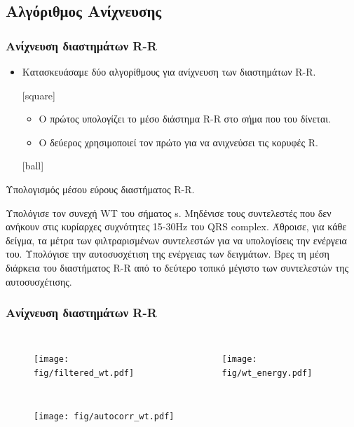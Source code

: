 \documentclass{beamer}
\begin{document}
\subsection{Αλγόριθμος Ανίχνευσης}
\begin{frame}
\frametitle{Ανίχνευση διαστημάτων R-R}

\begin{itemize}
\item Κατασκευάσαμε δύο αλγορίθμους για ανίχνευση των διαστημάτων R-R.

	[square]
	\begin{itemize}
	\item Ο πρώτος υπολογίζει το μέσο διάστημα R-R στο σήμα που του δίνεται.
	\item Ο δεύερος χρησιμοποιεί τον πρώτο για να ανιχνεύσει τις κορυφές R.
	\end{itemize}
	[ball]
\end{itemize}

\begin{algorithm}[H]
  \scriptsize  
  \caption{Υπολογισμός μέσου εύρους διαστήματος R-R.}
  \label{alg:mean_rr_interval}  
  \begin{algorithmic}[1]  
  	
  	\State Υπολόγισε τον συνεχή WT του σήματος s.
  	\State Μηδένισε τους συντελεστές που δεν ανήκουν στις κυρίαρχες συχνότητες 15-30Hz του QRS complex.
  	\State Άθροισε, για κάθε δείγμα, τα μέτρα των φιλτραρισμένων συντελεστών για να υπολογίσεις την ενέργεια του.
  	\State Υπολόγισε την αυτοσυσχέτιση της ενέργειας των δειγμάτων.
  	\State Βρες τη μέση διάρκεια του διαστήματος R-R από το δεύτερο τοπικό μέγιστο των συντελεστών της αυτοσυσχέτισης.
  	
  \end{algorithmic}  
\end{algorithm}
\end{frame}

\begin{frame}
\frametitle{Ανίχνευση διαστημάτων R-R}

\centering
\begin{columns}
\begin{figure}
\texttt{[image: fig/filtered\_wt.pdf]}
\end{figure}

\begin{figure}
\texttt{[image: fig/wt\_energy.pdf]}
\end{figure}
\end{columns}

\begin{figure}
\texttt{[image: fig/autocorr\_wt.pdf]}
\end{figure}

\end{frame}
\end{document}
